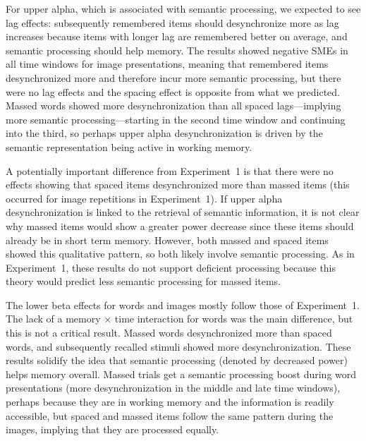 For upper alpha, which is associated with semantic processing, we expected to see lag effects: subsequently remembered items should desynchronize more as lag increases because items with longer lag are remembered better on average, and semantic processing should help memory.  The results showed negative SMEs in all time windows for image presentations, meaning that remembered items desynchronized more and therefore incur more semantic processing, but there were no lag effects and the spacing effect is opposite from what we predicted.  Massed words showed more desynchronization than all spaced lags---implying more semantic processing---starting in the second time window and continuing into the third, so perhaps upper alpha desynchronization is driven by the semantic representation being active in working memory.

A potentially important difference from Experiment~1 is that there were no effects showing that spaced items desynchronized more than massed items (this occurred for image repetitions in Experiment~1).  If upper alpha desynchronization is linked to the retrieval of semantic information, it is not clear why massed items would show a greater power decrease since these items should already be in short term memory.  However, both massed and spaced items showed this qualitative pattern, so both likely involve semantic processing.  As in Experiment~1, these results do not support deficient processing because this theory would predict less semantic processing for massed items.


The lower beta effects for words and images mostly follow those of Experiment~1.  The lack of a memory $\times$ time interaction for words was the main difference, but this is not a critical result.  Massed words desynchronized more than spaced words, and subsequently recalled stimuli showed more desynchronization.  These results solidify the idea that semantic processing (denoted by decreased power) helps memory overall.  Massed trials get a semantic processing boost during word presentations (more desynchronization in the middle and late time windows), perhaps because they are in working memory and the information is readily accessible, but spaced and massed items follow the same pattern during the images, implying that they are processed equally.

